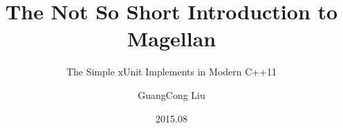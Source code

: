 \title[Magellan]
{The Not So Short Introduction to Magellan}

\subtitle{The Simple xUnit Implements in Modern C++11}

\author[Horance Liu]
{ GuangCong Liu
}


\date[2015-08-10]{2015.08}